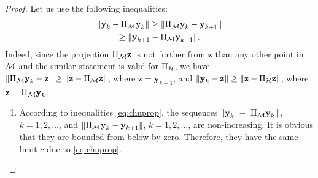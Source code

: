 \documentclass[sii]{ipart}
\newcommand{\bfy}{\textbf{y}}
\newcommand{\bfz}{\textbf{z}}
\begin{document}
\begin{proof}
	Let us use the following inequalities:
	\begin{multline}
	\label{eq:chuprop}
	\|\bfy_k - \Pi_{\calM} \bfy_k\| \ge \|\Pi_{\calM} \bfy_k - \bfy_{k + 1}\| \\ \ge \|\bfy_{k+1} - \Pi_{\calM} \bfy_{k + 1}\|.
	\end{multline}
Indeed, since the projection $\Pi_\calM \bfz$ is not further from $\bfz$ than any other point in $\mathcal{M}$ and the similar statement is valid for
$\Pi_{\mathcal{H}}$, we have $\|\Pi_{\calM} \bfy_k - \bfz\| \ge \|\bfz - \Pi_{\calM} \bfz\|$, where $\bfz=\bfy_{k+1}$, and $\|\bfy_k - \bfz\| \ge \|\bfz - \Pi_{\calH} \bfz\|$, where $\bfz=\Pi_{\calM} \bfy_k$.
	\begin{enumerate}
		\item According to inequalities \eqref{eq:chuprop}, the sequences $\|\bfy_k~-~\Pi_{\calM} \bfy_k\|$, $k = 1, 2, \ldots$, and $\|\Pi_{\calM} \bfy_k - \bfy_{k + 1}\|$, $k = 1, 2, \ldots$, are non-increasing. It is obvious that they are bounded from below by zero. Therefore, they have the same limit $c$ due to \eqref{eq:chuprop}.
		

\end{enumerate}
\end{proof}
\end{document}
